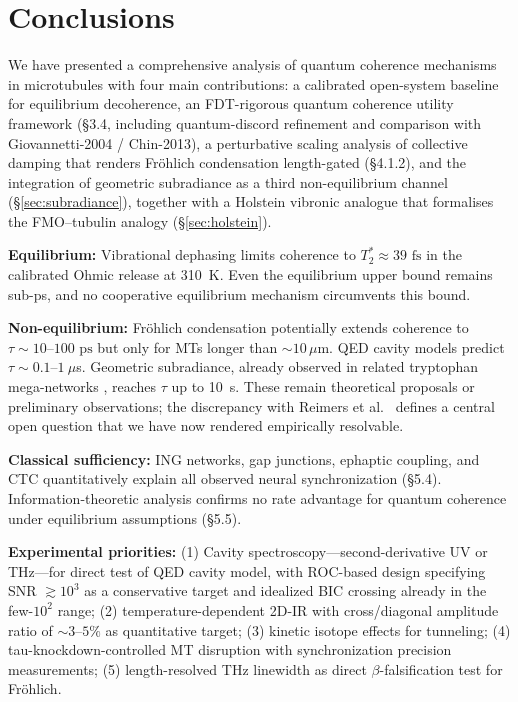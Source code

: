\documentclass[twocolumn,10pt]{article}
\newcommand{\ps}{\text{~ps}}
\newcommand{\fs}{\text{~fs}}
\begin{document}
\section{Conclusions}

We have presented a comprehensive analysis of quantum coherence mechanisms
in microtubules with four main contributions: a calibrated open-system
baseline for equilibrium decoherence, an
FDT-rigorous quantum coherence utility framework (\S 3.4, including
quantum-discord refinement and comparison with Giovannetti-2004 /
Chin-2013), a perturbative scaling analysis of collective damping that
renders Fr\"ohlich condensation length-gated (\S 4.1.2), and the
integration of geometric subradiance as a third non-equilibrium channel
(\S\ref{sec:subradiance}), together with a Holstein vibronic analogue that
formalises the FMO--tubulin analogy (\S\ref{sec:holstein}).

\textbf{Equilibrium:} Vibrational dephasing limits coherence to
$T_2^* \approx 39\fs$ in the calibrated Ohmic release at 310~K. Even the
equilibrium upper bound remains sub-ps, and no cooperative equilibrium mechanism
circumvents this bound.

\textbf{Non-equilibrium:} Fr\"ohlich condensation potentially extends
coherence to $\tau \sim 10\text{--}100\ps$ but only for MTs longer than
$\sim 10\,\mu$m. QED cavity models predict $\tau \sim 0.1\text{--}1~\mu$s.
Geometric subradiance, already observed in related tryptophan mega-networks
\cite{Babcock2024}, reaches $\tau$ up to 10~s. These remain theoretical
proposals or preliminary observations; the discrepancy with Reimers et
al.\ \cite{Reimers2009} defines a central open question that we have now
rendered empirically resolvable.

\textbf{Classical sufficiency:} ING networks, gap junctions, ephaptic
coupling, and CTC quantitatively explain all observed neural
synchronization (\S 5.4). Information-theoretic analysis confirms no rate
advantage for quantum coherence under equilibrium assumptions (\S 5.5).

\textbf{Experimental priorities:} (1) Cavity spectroscopy---second-derivative
UV or THz---for direct test of QED cavity model, with ROC-based design
specifying SNR $\gtrsim 10^3$ as a conservative target and idealized BIC
crossing already in the few-$10^2$ range; (2) temperature-dependent 2D-IR
with cross/diagonal amplitude ratio of $\sim 3\text{--}5\%$ as
quantitative target; (3) kinetic isotope effects for tunneling;
(4) tau-knockdown-controlled MT disruption with synchronization precision
measurements; (5) length-resolved THz linewidth as direct
$\beta$-falsification test for Fr\"ohlich.
\end{document}
